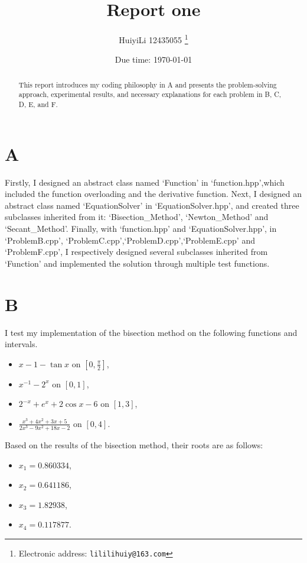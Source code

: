 \documentclass[a4paper]{article}
\begin{document}
\title{Report one}

\author{HuiyiLi 12435055
  \thanks{Electronic address: \texttt{lililihuiy@163.com}}}


\date{Due time: \today}

\maketitle
 \begin{abstract}
  This report introduces my coding philosophy in A and presents the problem-solving approach, experimental results, and necessary explanations for each problem in B, C, D, E, and F.     
\end{abstract} 


\section{A}
Firstly, I designed an abstract class named `Function' in `function.hpp',which included the function overloading
 and the derivative function. Next, I designed an abstract class named `EquationSolver' in `EquationSolver.hpp', 
and created three subclasses inherited from it: `Bisection\_Method', `Newton\_Method' and `Secant\_Method'.
 Finally, with `function.hpp' and `EquationSolver.hpp', in `ProblemB.cpp', `ProblemC.cpp',`ProblemD.cpp',`ProblemE.cpp' and `ProblemF.cpp',
I respectively designed several subclasses inherited from `Function' and implemented the solution
through multiple test functions.

\section{B}
I test my implementation of the bisection method on the following functions and intervals.
\begin{itemize}
  \item \( x - 1 - \tan x \) on \([0, \frac{\pi}{2}]\),
  \item \( x^{-1} - 2^x \) on \([0, 1]\),
  \item \( 2^{-x} + e^x + 2 \cos x - 6 \) on \([1, 3]\),
  \item \( \frac{x^3 + 4x^2 + 3x + 5}{2x^3 - 9x^2 + 18x - 2} \) on \([0, 4]\).
\end{itemize}
Based on the results of the bisection method, their roots are as follows:
\begin{itemize}
  \item $x_1 = 0.860334$,
  \item $x_2 = 0.641186$,
  \item $x_3 = 1.82938$,
  \item $x_4 = 0.117877$.
\end{itemize}
\end{document}
